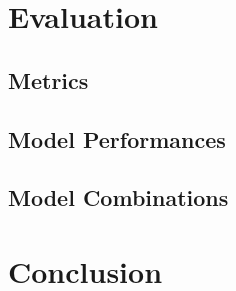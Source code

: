 \documentclass[10pt,sigconf]{acmart}
\makeatletter
\newcommand{\specialcellbold}[2][c]{%
  \bfseries
  \begin{tabular}[#1]{@{}l@{}}#2\end{tabular}%
}
\makeatother
\begin{document}
\section{Evaluation}

\subsection{Metrics}

\subsection{Model Performances}

\subsection{Model Combinations}


\section{Conclusion}




 
\end{document}
